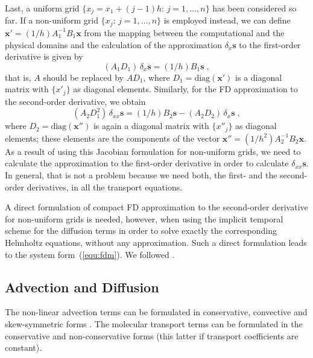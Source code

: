 Last, a uniform grid $\{x_j=x_1+(j-1)h:\, j = 1,\ldots,n\}$ has been considered
so far. If a non-uniform grid $\{x_j:\, j = 1,\ldots,n\}$ is employed instead,
we can define $\mathbf{x'} = (1/h)A_1^{-1}B_1\mathbf{x}$ from the mapping
between the computational and the physical domains and the calculation of the
approximation $\delta_{x} \mathbf{s}$ to the first-order derivative is given by
\begin{equation}
  (A_1D_1)\, \delta_x \mathbf{s}=(1/h)B_1 \mathbf{s} \;,
\end{equation}
that is, $A$ should be replaced by $AD_1$, where $D_1=\text{diag} (\mathbf{x'})$
is a diagonal matrix with $\{x'_j\}$ as diagonal elements. Similarly, for the FD
approximation to the second-order derivative, we obtain
\begin{equation}
  (A_2D_1^2)\, \delta_{xx} \mathbf{s}=(1/h)B_2 \mathbf{s} - (A_2D_2)\,\delta_x
  \mathbf{s} \;,
\end{equation}
where $D_2=\text{diag} (\mathbf{x''})$ is again a diagonal matrix with
$\{x''_j\}$ as diagonal elements; these elements are the components of the
vector $\mathbf{x''} = (1/h^2)A_2^{-1}B_2\mathbf{x}$. As a result of using this
Jacobian formulation for non-uniform grids, we need to calculate the
approximation to the first-order derivative in order to calculate $\delta_{xx}
\mathbf{s}$. In general, that is not a problem because we need both, the first-
and the second-order derivatives, in all the transport equations.

A direct formulation of compact FD approximation to the second-order derivative
for non-uniform grids is needed, however, when using the implicit temporal
scheme for the diffusion terms in order to solve exactly the corresponding
Helmholtz equations, without any approximation. Such a direct formulation leads
to the system form~(\ref{equ:fdm}). We followed \cite{Shukla:2005}.

\subsection{Advection and Diffusion}

The non-linear advection terms can be formulated in conservative, convective and
skew-symmetric forms \citep{Blaisdell:1996,Kravchenko:1997}. The molecular
transport terms can be formulated in the conservative and non-conservative forms
(this latter if transport coefficients are constant).

